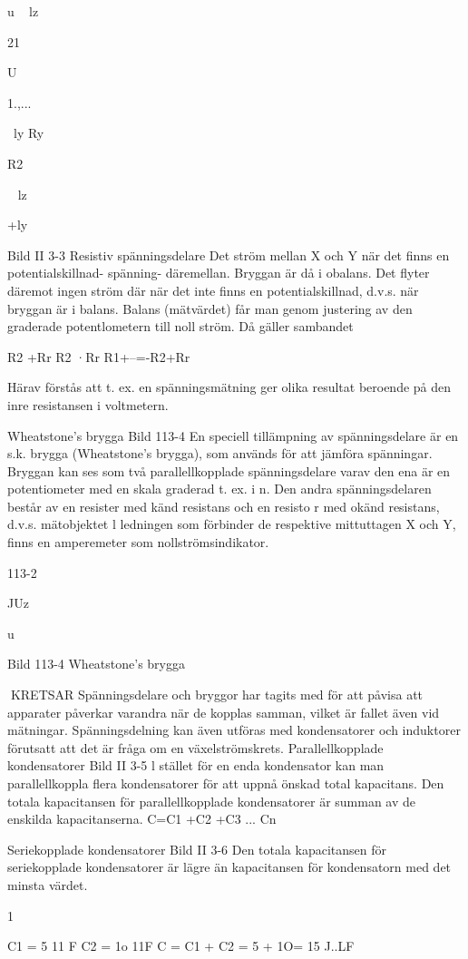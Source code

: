u
~ lz

21

U

1.,...

~ly
Ry

R2

~ lz

+ly

Bild II 3-3 Resistiv spänningsdelare
Det
ström mellan X och Y när det
finns en potentialskillnad- spänning- däremellan. Bryggan är då i obalans.
Det flyter däremot ingen ström där när
det inte finns en potentialskillnad, d.v.s. när
bryggan är i balans. Balans (mätvärdet) får
man genom justering av den graderade
potentlometern till noll ström. Då gäller sambandet

R2 +Rr
R2 ·Rr
R1+--=-R2+Rr

Härav förstås att t. ex. en spänningsmätning ger olika resultat beroende på den inre
resistansen i voltmetern.

Wheatstone's brygga
Bild 113-4
En speciell tillämpning av spänningsdelare
är en s.k. brygga (Wheatstone's brygga),
som används för att jämföra spänningar.
Bryggan kan ses som två parallellkopplade spänningsdelare varav den ena är en
potentiometer med en skala graderad t. ex.
i n. Den andra spänningsdelaren består av
en resister med känd resistans och en resisto r med okänd resistans, d.v.s. mätobjektet
l ledningen som förbinder de respektive mittuttagen X och Y, finns en amperemeter som
nollströmsindikator.

113-2

JUz

u

Bild 113-4 Wheatstone's brygga

KRETSAR
Spänningsdelare och bryggor har tagits
med för att påvisa att apparater påverkar
varandra när de kopplas samman, vilket är
fallet även vid mätningar.
Spänningsdelning kan även utföras med
kondensatorer och induktorer förutsatt att
det är fråga om en växelströmskrets.
Parallellkopplade kondensatorer
Bild II 3-5
l stället för en enda kondensator kan man
parallellkoppla flera kondensatorer för att
uppnå önskad total kapacitans.
Den totala kapacitansen för parallellkopplade kondensatorer är summan av de
enskilda kapacitanserna.
C=C1 +C2 +C3 ... Cn

Seriekopplade kondensatorer
Bild II 3-6
Den totala kapacitansen för seriekopplade
kondensatorer är lägre än kapacitansen för
kondensatorn med det minsta värdet.

1

C1 = 5 11 F C2 = 1o 11F
C = C1 + C2 = 5 + 1O= 15 J..LF

